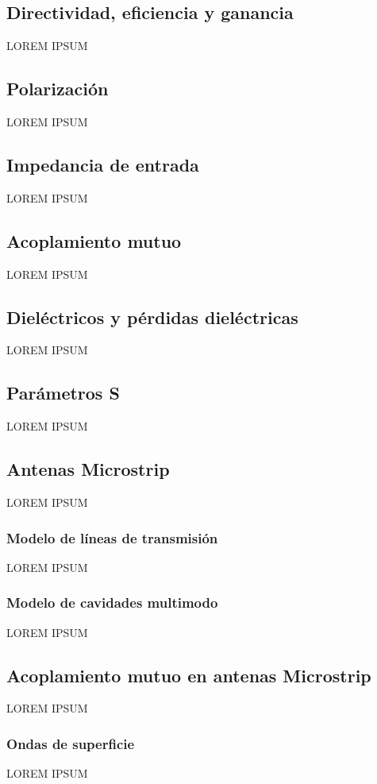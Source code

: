 \subsection{Directividad, eficiencia y ganancia}
\label{subsubsec_directividad}
LOREM IPSUM
\subsection{Polarización}
\label{subsubsec_polarizacion}
LOREM IPSUM

\subsection{Impedancia de entrada}
\label{subsec_imp_entrada}
LOREM IPSUM
\subsection{Acoplamiento mutuo}
\label{subsec_acoplamiento}
LOREM IPSUM
\subsection{Dieléctricos y pérdidas dieléctricas}
\label{subsec_dielectricos}
LOREM IPSUM
\subsection{Parámetros S}
\label{subsec_parametros_s}
LOREM IPSUM

\subsection{Antenas Microstrip}
\label{subsec_antenas_microstrip}
LOREM IPSUM
\subsubsection{Modelo de líneas de transmisión}
\label{subsubsec_microstrip_modeloLineas}
LOREM IPSUM
\subsubsection{Modelo de cavidades multimodo}
\label{subsubsec_microstrip_modeloCavidades}
LOREM IPSUM

\subsection{Acoplamiento mutuo en antenas Microstrip}
\label{subsec_acoplamiento_microstrip}
LOREM IPSUM
\subsubsection{Ondas de superficie}
\label{subsubsec_microstrip_ondas_superficie}
LOREM IPSUM


